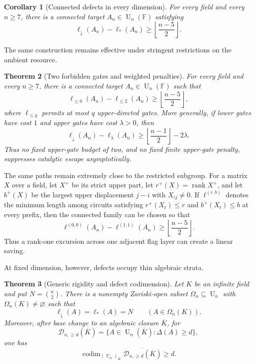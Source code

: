 \documentclass[11pt]{amsart}
\numberwithin{equation}{section}
\newtheorem{theorem}{Theorem}[section]
\newtheorem{corollary}[theorem]{Corollary}
\theoremstyle{definition}
\theoremstyle{remark}
\newcommand{\F}{\mathbb F}
\newcommand{\U}{\operatorname{U}}
\newcommand{\rank}{\operatorname{rank}}
\newcommand{\ellDown}{\ell_{\downarrow}}
\newcommand{\ellAll}{\ell_{*}}
\newcommand{\ellBudget}[1]{\ell_{\le #1}}
\newcommand{\ellWeight}[1]{\ell_{#1}}
\newcommand{\DeltaDef}{\Delta}
\newcommand{\ellExc}[2]{\ell^{(#1,#2)}}
\newcommand{\codim}{\operatorname{codim}}
\begin{document}
\begin{corollary}[Connected defects in every dimension]\label{cor:connected-gap}
For every field and every $n\ge7$, there is a connected target $A_n\in\U_n(\F)$ satisfying
\[
\ellDown(A_n)-\ellAll(A_n)
\ge
\left\lfloor\frac{n-5}{2}\right\rfloor.
\]
\end{corollary}

The same construction remains effective under stringent restrictions on the ambient resource.

\begin{theorem}[Two forbidden gates and weighted penalties]\label{thm:resource-robustness}
For every field and every $n\ge7$, there is a connected target $A_n\in\U_n(\F)$ such that
\[
\ellBudget{0}(A_n)-\ellBudget{2}(A_n)
\ge
\left\lfloor\frac{n-5}{2}\right\rfloor,
\]
where $\ellBudget{q}$ permits at most $q$ upper-directed gates.  More generally, if lower gates have cost $1$ and upper gates have cost $\lambda>0$, then
\[
\ellDown(A_n)-\ellWeight{\lambda}(A_n)
\ge
\left\lfloor\frac{n-1}{2}\right\rfloor-2\lambda.
\]
Thus no fixed upper-gate budget of two, and no fixed finite upper-gate penalty, suppresses catalytic escape asymptotically.
\end{theorem}

The same paths remain extremely close to the restricted subgroup.  For a matrix $X$ over a field, let $X^+$ be its strict upper part, let $r^+(X)=\rank X^+$, and let $b^+(X)$ be the largest upper displacement $j-i$ with $X_{ij}\ne0$.  If $\ellExc{r}{b}$ denotes the minimum length among circuits satisfying $r^+(X_t)\le r$ and $b^+(X_t)\le b$ at every prefix, then the connected family can be chosen so that
\[
\ellExc{0}{0}(A_n)-\ellExc{1}{1}(A_n)
\ge
\left\lfloor\frac{n-5}{2}\right\rfloor.
\]
Thus a rank-one excursion across one adjacent flag layer can create a linear saving.

At fixed dimension, however, defects occupy thin algebraic strata.

\begin{theorem}[Generic rigidity and defect codimension]\label{thm:generic-rigidity-intro}
Let $K$ be an infinite field and put $N=\binom n2$.  There is a nonempty Zariski-open subset $\Omega_n\subseteq\U_n$ with $\Omega_n(K)\ne\varnothing$ such that
\[
\ellDown(A)=\ellAll(A)=N
\qquad(A\in\Omega_n(K)).
\]
Moreover, after base change to an algebraic closure $\overline K$, for
\[
\mathcal D_{n,\ge d}(\overline K)
=\{A\in\U_n(\overline K):\DeltaDef(A)\ge d\},
\]
one has
\[
\codim_{(\U_n)_{\overline K}}
\overline{\mathcal D_{n,\ge d}(\overline K)}\ge d.
\]
\end{theorem}
\end{document}

